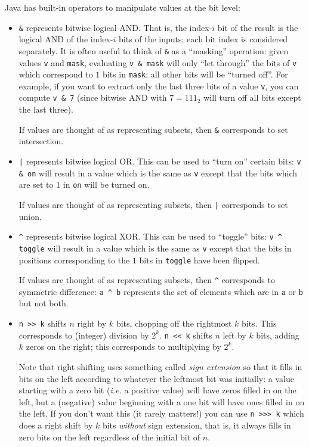 \documentclass[10pt]{book}
\begin{document}
Java has built-in operators to manipulate values at the bit level:
\begin{itemize}
\item \texttt{\&} represents bitwise logical AND.  That is, the
  index-$i$ bit of the result is the logical AND of the index-$i$ bits
  of the inputs; each bit index is considered separately.  It is often
  useful to think of \texttt{\&} as a ``masking'' operation: given
  values \texttt{v} and \texttt{mask}, evaluating \texttt{v \& mask}
  will only ``let through'' the bits of \texttt{v} which correspond to
  $1$ bits in \texttt{mask}; all other bits will be ``turned off''.
  For example, if you want to extract only the last three bits of a
  value \texttt{v}, you can compute \texttt{v \& 7} (since bitwise AND
  with $7 = 111_2$ will turn off all bits except the last three).

  If values are thought of as representing subsets, then \texttt{\&}
  corresponds to set intersection.
\item \texttt{|} represents bitwise logical OR.  This can be used to
  ``turn on'' certain bits: \texttt{v \& on} will result in a value
  which is the same as \texttt{v} except that the bits which are set
  to $1$ in \texttt{on} will be turned on.

  If values are thought of as representing subsets, then \texttt{|}
  corresponds to set union.
\item \verb|^| represents bitwise logical XOR.  This can be used to
  ``toggle'' bits: \verb|v ^ toggle| will result in a value which is
  the same as \texttt{v} except that the bits in positions
  corresponding to the $1$ bits in \texttt{toggle} have been flipped.

  If values are thought of as representing subsets, then \verb|^|
  corresponds to symmetric difference: \verb|a ^ b| represents the set
  of elements which are in \verb|a| or \verb|b| but not both.
\item \verb|n >> k| shifts $n$ right by $k$ bits, chopping off the
  rightmost $k$ bits.  This corresponds to (integer) division by
  $2^k$.  \verb|n << k| shifts $n$ left by $k$ bits, adding $k$ zeros
  on the right; this corresponds to multiplying by $2^k$.

  Note that right shifting uses something called \emph{sign extension}
  so that it fills in bits on the left according to whatever the
  leftmost bit was initially: a value starting with a zero bit
  (\emph{i.e.} a positive value) will have zeros filled in on the
  left, but a (negative) value beginning with a one bit will have ones
  filled in on the left.  If you don't want this (it rarely matters!)
  you can use \verb|n >>> k| which does a right shift by $k$ bits
  \emph{without} sign extension, that is, it always fills in zero bits
  on the left regardless of the initial bit of $n$.
\end{itemize}
\end{document}
